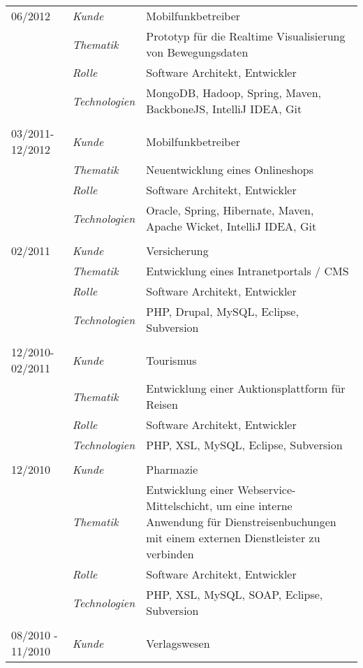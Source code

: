 \begin{longtable}{@{}>{}p{4cm}>{\itshape}p{2cm}>{}p{9cm}}
\\
06/2012             & Kunde 	    & Mobilfunkbetreiber\\
\nopagebreak		& Thematik	    & Prototyp für die Realtime Visualisierung von Bewegungsdaten \\
\nopagebreak		& Rolle 	    & Software Architekt, Entwickler\\
\nopagebreak		& Technologien	& MongoDB, Hadoop, Spring, Maven, BackboneJS, IntelliJ IDEA, Git\\
\\
03/2011-12/2012     & Kunde 	    & Mobilfunkbetreiber\\
\nopagebreak		& Thematik	    & Neuentwicklung eines Onlineshops \\
\nopagebreak		& Rolle 	    & Software Architekt, Entwickler\\
\nopagebreak		& Technologien	& Oracle, Spring, Hibernate, Maven, Apache Wicket, IntelliJ IDEA, Git\\
\\
02/2011             & Kunde 	    & Versicherung\\
\nopagebreak		& Thematik	    & Entwicklung eines Intranetportals / CMS\\
\nopagebreak		& Rolle 	    & Software Architekt, Entwickler\\
\nopagebreak		& Technologien	& PHP, Drupal, MySQL, Eclipse, Subversion\\
\\
12/2010-02/2011     & Kunde 	    & Tourismus\\
\nopagebreak		& Thematik	    & Entwicklung einer Auktionsplattform für Reisen\\
\nopagebreak		& Rolle 	    & Software Architekt, Entwickler\\
\nopagebreak		& Technologien	& PHP, XSL, MySQL, Eclipse, Subversion\\
\\
12/2010         	& Kunde 	    & Pharmazie\\
\nopagebreak		& Thematik	    & Entwicklung einer Webservice-Mittelschicht, um eine interne Anwendung für Dienstreisenbuchungen mit einem externen Dienstleister zu verbinden\\
\nopagebreak		& Rolle 	    & Software Architekt, Entwickler\\
\nopagebreak		& Technologien	& PHP, XSL, MySQL, SOAP, Eclipse, Subversion\\
\\
08/2010 - 11/2010	& Kunde 	    & Verlagswesen\\

\end{longtable}
